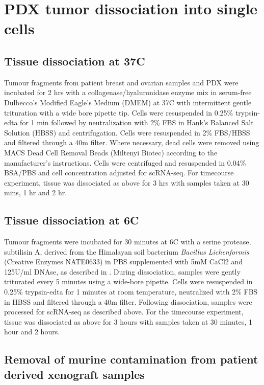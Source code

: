 \section{PDX tumor dissociation into single cells}

\subsection{Tissue dissociation at 37\textdegree C}
Tumour fragments from patient breast and ovarian samples and PDX were incubated for 2 hrs with a collagenase/hyaluronidase enzyme mix in serum-free Dulbecco's Modified Eagle's Medium (DMEM) at 37\textdegree C with intermittent gentle trituration with a wide bore pipette tip. Cells were resuspended in 0.25\% trypsin-edta for 1 min followed by neutralization with 2\% FBS in Hank's Balanced Salt Solution (HBSS) and centrifugation. Cells were resuspended in 2\% FBS/HBSS and filtered through a 40\textmu m filter. Where necessary, dead cells were removed using MACS Dead Cell Removal Beads (Miltenyi Biotec) according to the manufacturer's instructions. Cells were centrifuged and resuspended in 0.04\%  BSA/PBS and cell concentration adjusted for scRNA-seq. For timecourse experiment, tissue was dissociated as above for 3 hrs with samples taken at 30 mins, 1 hr and 2 hr.

\subsection{Tissue dissociation at 6\textdegree C}
Tumour fragments were incubated for 30 minutes at 6\textdegree C with a serine protease, subtilisin A, derived from the Himalayan soil bacterium \textit{Bacillus Lichenformis} (Creative Enzymes NATE0633) in PBS supplemented with 5mM CaCl2 and 125U/ml DNAse, as described in \cite{adam2017psychrophilic, potter2019dissociation}. During dissociation, samples were gently triturated every 5 minutes using a wide-bore pipette. Cells were resuspended in 0.25\% trypsin-edta for 1 minutes at room temperature, neutralized with 2\% FBS in HBSS and filtered through a 40\textmu m filter. Following dissociation, samples were processed for scRNA-seq as described above. For the timecourse experiment, tissue was dissociated as above for 3 hours with samples taken at 30 minutes, 1 hour and 2 hours. 

\subsection{Removal of murine contamination from patient derived xenograft samples}

